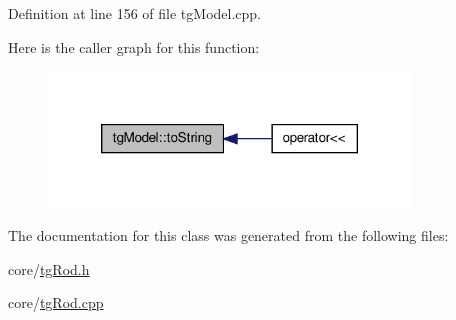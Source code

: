 Definition at line 156 of file tg\-Model.\-cpp.



Here is the caller graph for this function\-:\nopagebreak
\begin{figure}[H]
\begin{center}
\leavevmode
\includegraphics[width=272pt]{classtg_model_af37b0c1a6d4060bfe0bb9b5038a17725_icgraph}
\end{center}
\end{figure}




The documentation for this class was generated from the following files\-:\begin{DoxyCompactItemize}
\item 
core/\hyperlink{tg_rod_8h}{tg\-Rod.\-h}\item 
core/\hyperlink{tg_rod_8cpp}{tg\-Rod.\-cpp}\end{DoxyCompactItemize}
